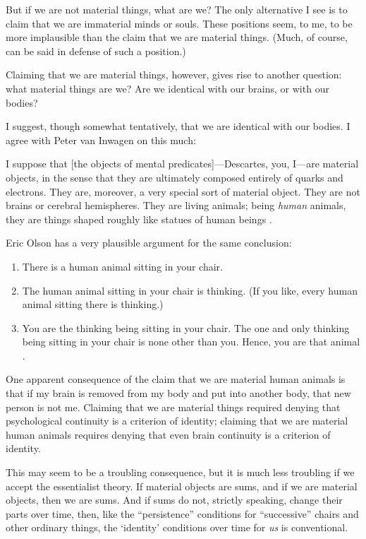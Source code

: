 \documentclass[11pt]{article}
\newenvironment{squote}{%
\begin{spacing}{1}
\begin{list}{}{%
\setlength{\labelwidth}{0pt}%
\rightmargin\leftmargin%
}
\item\relax
}{%
\end{list}%
\end{spacing}
}
\begin{document}
\begin{spacing}{1.5}
But if we are not material things, what are we?  The only alternative
I see is to claim that we are immaterial minds or souls.  These
positions seem, to me, to be more implausible than the claim that we
are material things.  (Much, of course, can be said in defense of such
a position.)

Claiming that we are material things, however, gives rise to another
question: what material things are we?  Are we identical with our
brains, or with our bodies?

I suggest, though somewhat tentatively, that we are identical with our
bodies.  I agree with Peter van Inwagen on this much:

\begin{squote}
I suppose that [the objects of mental predicates]---Descartes, you,
I---are material objects, in the sense that they are ultimately
composed entirely of quarks and electrons.  They are, moreover, a very
special sort of material object.  They are not brains or cerebral
hemispheres.  They are living animals; being {\em human} animals, they
are things shaped roughly like statues of human beings
\citeyearpar[6]{inwagen1995}.
\end{squote}

Eric Olson has a very plausible argument for the same conclusion:

\begin{enumerate}
  \item There is a human animal sitting in your chair.
  \item The human animal sitting in your chair is thinking. (If you
    like, every human animal sitting there is thinking.)
  \item You are the thinking being sitting in your chair. The one and
    only thinking being sitting in your chair is none other than
    you. Hence, you are that animal \citeyearpar[354]{olson2003a}.
\end{enumerate}

One apparent consequence of the claim that we are material human
animals is that if my brain is removed from my body and put into
another body, that new person is not me.  Claiming that we are
material things required denying that psychological continuity is a
criterion of identity; claiming that we are material human animals
requires denying that even brain continuity is a criterion of
identity.

This may seem to be a troubling consequence, but it is much less
troubling if we accept the essentialist theory.  If material objects
are sums, and if we are material objects, then we are sums.  And if
sums do not, strictly speaking, change their parts over time, then,
like the ``persistence'' conditions for ``successive'' chairs and
other ordinary things, the `identity' conditions over time for {\em
  us} is conventional.


\end{spacing}
\end{document}
